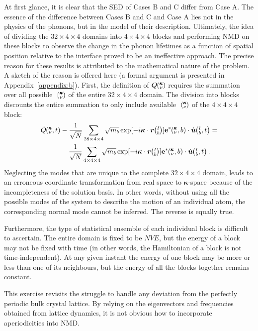 At first glance, it is clear that the SED of Cases B and C differ from Case A. The essence of the difference between Cases B and C and Case A lies not in the physics of the phonons, but in the model of their description. Ultimately, the idea of dividing the $32\times4\times4$ domains into $4\times4\times4$ blocks and performing NMD on these blocks to observe the change in the phonon lifetimes as a function of spatial position relative to the interface proved to be an ineffective approach.
The precise reason for these results is attributed to the mathematical nature of the problem. A sketch of the reason is offered here (a formal argument is presented in Appendix~\ref{appendix:b}). First, the definition of $Q \mspace{-4.0mu}\left(\mspace{-8.0mu} \begin{smallmatrix}&\pmb{\kappa} \\&\nu\end{smallmatrix} \mspace{-3.0mu}\right) $ requires the summation over all possible ~$\mspace{-4.0mu}\left(\mspace{-8.0mu} \begin{smallmatrix}&\pmb{\kappa} \\&\nu\end{smallmatrix} \mspace{-3.0mu}\right)$ of the entire $32\times4\times4$ domain. The division into blocks discounts the entire summation to only include available ~$\mspace{-4.0mu}\left(\mspace{-8.0mu} \begin{smallmatrix}&\pmb{\kappa} \\&\nu\end{smallmatrix} \mspace{-3.0mu}\right)$ of the $4\times4\times4$ block:
\begin{eqnarray}
\begin{split}
\dot{Q}\kvt-\frac{1}{\sqrt{N}}\sum_{28\times4\times4}\sqrt{m_b}\exp[-i\bm{\kappa}\cdot\bm{r}\lb]\bm{\mathrm{e}}^*\kvb\cdot\dot{\bm{u}}\lbt&=\\\frac{1}{\sqrt{N}}\sum_{4\times4\times4}\sqrt{m_b}\exp[-i\bm{\kappa}\cdot\bm{r}\lb ]\bm{\mathrm{e}}^*\kvb\cdot\dot{\bm{u}}\lbt.
\end{split}
\end{eqnarray}
Neglecting the modes that are unique to the complete $32\times4\times4$ domain, leads to an erroneous coordinate transformation from real space to $\pmb{\kappa}$-space because of the incompleteness of the solution basis. In other words, without using all the possible modes of the system to describe the motion of an individual atom, the corresponding normal mode cannot be inferred. The reverse is equally true.

Furthermore, the type of statistical ensemble of each individual block is difficult to ascertain. The entire domain is fixed to be $NVE$, but the energy of a block may not be fixed with time (in other words, the Hamiltonian of a block is not time-independent). At any given instant the energy of one block may be more or less than one of its neighbours, but the energy of all the blocks together remains constant.

This exercise revisits the struggle to handle any deviation from the perfectly periodic bulk crystal lattice. By relying on the eigenvectors and frequencies obtained from lattice dynamics, it is not obvious how to incorporate aperiodicities into NMD.


